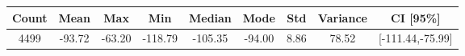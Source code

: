 \begin{tabular}{|c|c|c|c|c|c|c|c|c|}\hline
\rowcolor{Plum!20}
Count&Mean&Max&Min&Median&Mode&Std&Variance&CI [95\%]\\\hline\hline
4499&-93.72&-63.20&-118.79&-105.35&-94.00&8.86&78.52&[-111.44,-75.99]\\\hline
\end{tabular}

